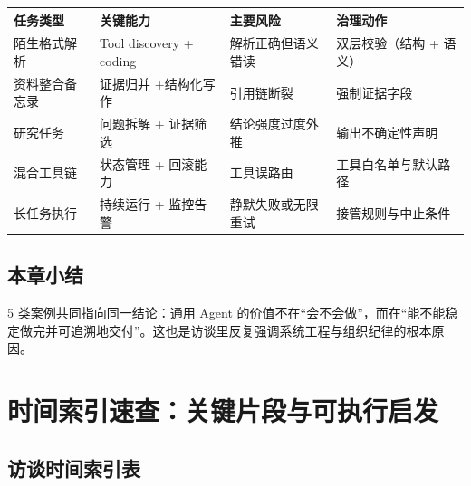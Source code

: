 \documentclass[a4paper]{article}
\begin{document}
\begin{center}
\begin{tabular}{p{3.0cm}p{3.5cm}p{4.1cm}p{3.5cm}}
\toprule
任务类型 & 关键能力 & 主要风险 & 治理动作 \\
\midrule
陌生格式解析 & Tool discovery + coding & 解析正确但语义错读 & 双层校验（结构 + 语义） \\
资料整合备忘录 & 证据归并 +结构化写作 & 引用链断裂 & 强制证据字段 \\
研究任务 & 问题拆解 + 证据筛选 & 结论强度过度外推 & 输出不确定性声明 \\
混合工具链 & 状态管理 + 回滚能力 & 工具误路由 & 工具白名单与默认路径 \\
长任务执行 & 持续运行 + 监控告警 & 静默失败或无限重试 & 接管规则与中止条件 \\
\bottomrule
\end{tabular}
\end{center}

\subsection{本章小结}

5 类案例共同指向同一结论：通用 Agent 的价值不在“会不会做”，而在“能不能稳定做完并可追溯地交付”。这也是访谈里反复强调系统工程与组织纪律的根本原因。


\section{时间索引速查：关键片段与可执行启发}

\subsection{访谈时间索引表}
\end{document}
